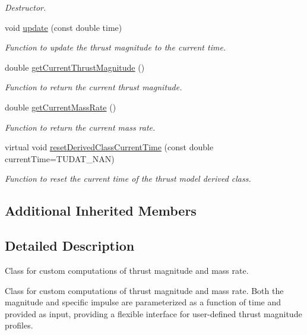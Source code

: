 \begin{DoxyCompactItemize}
\begin{DoxyCompactList}\small\item\em Destructor. \end{DoxyCompactList}\item 
void \hyperlink{classtudat_1_1propulsion_1_1CustomThrustMagnitudeWrapper_ad018abccc9285d40a5776f706fd675a0}{update} (const double time)
\begin{DoxyCompactList}\small\item\em Function to update the thrust magnitude to the current time. \end{DoxyCompactList}\item 
double \hyperlink{classtudat_1_1propulsion_1_1CustomThrustMagnitudeWrapper_a8f8d5325f4570b0bd0420827386d787c}{get\+Current\+Thrust\+Magnitude} ()
\begin{DoxyCompactList}\small\item\em Function to return the current thrust magnitude. \end{DoxyCompactList}\item 
double \hyperlink{classtudat_1_1propulsion_1_1CustomThrustMagnitudeWrapper_a5de652e5d4f9f9e8b300c0f7ea79affc}{get\+Current\+Mass\+Rate} ()
\begin{DoxyCompactList}\small\item\em Function to return the current mass rate. \end{DoxyCompactList}\item 
virtual void \hyperlink{classtudat_1_1propulsion_1_1CustomThrustMagnitudeWrapper_a486076e5cf7a197691025e71b44533ee}{reset\+Derived\+Class\+Current\+Time} (const double current\+Time=T\+U\+D\+A\+T\+\_\+\+N\+AN)
\begin{DoxyCompactList}\small\item\em Function to reset the current time of the thrust model derived class. \end{DoxyCompactList}\end{DoxyCompactItemize}
\subsection*{Additional Inherited Members}


\subsection{Detailed Description}
Class for custom computations of thrust magnitude and mass rate. 

Class for custom computations of thrust magnitude and mass rate. Both the magnitude and specific impulse are parameterized as a function of time and provided as input, providing a flexible interface for user-\/defined thrust magnitude profiles. 

